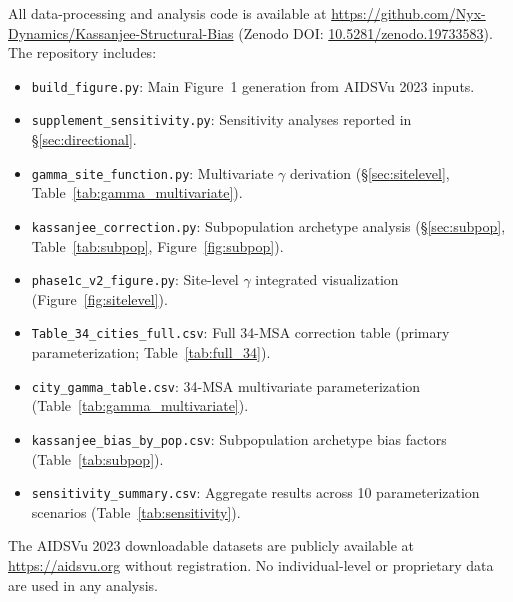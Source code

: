 \documentclass[11pt]{article}
\begin{document}
All data-processing and analysis code is available at \url{https://github.com/Nyx-Dynamics/Kassanjee-Structural-Bias} (Zenodo DOI: \href{https://doi.org/10.5281/zenodo.19733583}{10.5281/zenodo.19733583}). The repository includes:
\begin{itemize}
\item \texttt{build\_figure.py}: Main Figure~1 generation from AIDSVu 2023 inputs.
\item \texttt{supplement\_sensitivity.py}: Sensitivity analyses reported in §\ref{sec:directional}.
\item \texttt{gamma\_site\_function.py}: Multivariate $\gamma$ derivation (§\ref{sec:sitelevel}, Table~\ref{tab:gamma_multivariate}).
\item \texttt{kassanjee\_correction.py}: Subpopulation archetype analysis (§\ref{sec:subpop}, Table~\ref{tab:subpop}, Figure~\ref{fig:subpop}).
\item \texttt{phase1c\_v2\_figure.py}: Site-level $\gamma$ integrated visualization (Figure~\ref{fig:sitelevel}).
\item \texttt{Table\_34\_cities\_full.csv}: Full 34-MSA correction table (primary parameterization; Table~\ref{tab:full_34}).
\item \texttt{city\_gamma\_table.csv}: 34-MSA multivariate parameterization (Table~\ref{tab:gamma_multivariate}).
\item \texttt{kassanjee\_bias\_by\_pop.csv}: Subpopulation archetype bias factors (Table~\ref{tab:subpop}).
\item \texttt{sensitivity\_summary.csv}: Aggregate results across 10 parameterization scenarios (Table~\ref{tab:sensitivity}).
\end{itemize}
The AIDSVu 2023 downloadable datasets are publicly available at \url{https://aidsvu.org} without registration. No individual-level or proprietary data are used in any analysis.
\end{document}
